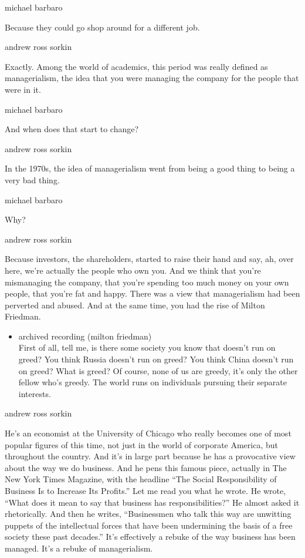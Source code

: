 michael barbaro

Because they could go shop around for a different job.

andrew ross sorkin

Exactly. Among the world of academics, this period was really defined as
managerialism, the idea that you were managing the company for the
people that were in it.

michael barbaro

And when does that start to change?

andrew ross sorkin

In the 1970s, the idea of managerialism went from being a good thing to
being a very bad thing.

michael barbaro

Why?

andrew ross sorkin

Because investors, the shareholders, started to raise their hand and
say, ah, over here, we're actually the people who own you. And we think
that you're mismanaging the company, that you're spending too much money
on your own people, that you're fat and happy. There was a view that
managerialism had been perverted and abused. And at the same time, you
had the rise of Milton Friedman.

\begin{itemize}
\tightlist
\item
  archived recording (milton friedman)\\
  First of all, tell me, is there some society you know that doesn't run
  on greed? You think Russia doesn't run on greed? You think China
  doesn't run on greed? What is greed? Of course, none of us are greedy,
  it's only the other fellow who's greedy. The world runs on individuals
  pursuing their separate interests.
\end{itemize}

andrew ross sorkin

He's an economist at the University of Chicago who really becomes one of
most popular figures of this time, not just in the world of corporate
America, but throughout the country. And it's in large part because he
has a provocative view about the way we do business. And he pens this
famous piece, actually in The New York Times Magazine, with the headline
``The Social Responsibility of Business Is to Increase Its Profits.''
Let me read you what he wrote. He wrote, ``What does it mean to say that
business has responsibilities?'' He almost asked it rhetorically. And
then he writes, ``Businessmen who talk this way are unwitting puppets of
the intellectual forces that have been undermining the basis of a free
society these past decades.'' It's effectively a rebuke of the way
business has been managed. It's a rebuke of managerialism.

